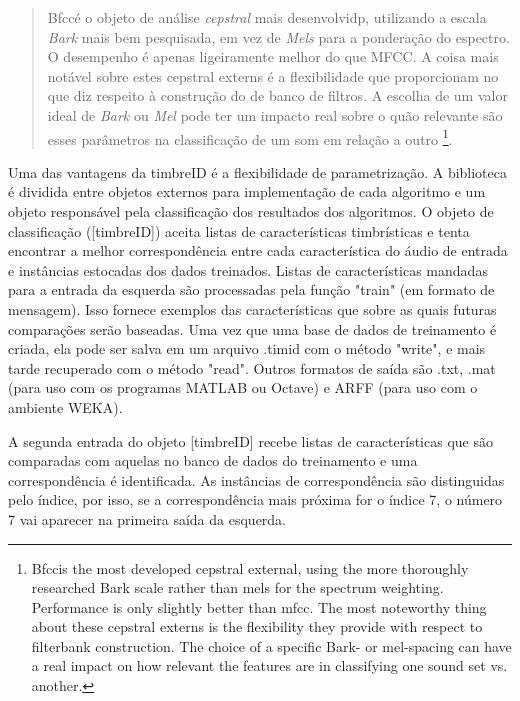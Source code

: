 \documentclass[draft]{ppgmus}
\begin{document}
\begin{quote}
Bfcc\texttildelow é o objeto de análise \textit{cepstral} mais desenvolvidp, utilizando a escala \textit{Bark} 
mais bem pesquisada, em vez de \textit{Mels} para a ponderação do espectro. O desempenho é apenas ligeiramente melhor do 
que MFCC\texttildelow. A coisa mais notável sobre estes cepstral externs é a flexibilidade que proporcionam no 
que diz respeito à construção do de banco de filtros. A escolha de um valor ideal de \textit{Bark} ou \textit{Mel} 
 pode ter um impacto real sobre o quão relevante são esses parâmetros na classificação de um som em relação a outro
\footnote{Bfcc\texttildelow is the most developed cepstral external, using the more thoroughly researched Bark scale rather than mels for 
the spectrum weighting. Performance is only slightly better than mfcc\texttildelow. The most noteworthy thing about these cepstral 
externs is the flexibility they provide with respect to filterbank construction. The choice of a specific Bark- or 
mel-spacing can have a real impact on how relevant the features are in classifying one sound set vs. another.}. 
\cite{brentcepstral}
 
\end{quote}


Uma das vantagens da timbreID é a flexibilidade de parametrização. A biblioteca é dividida
entre objetos externos para implementação de cada algoritmo e um objeto responsável pela
classificação dos resultados dos algoritmos. O objeto de classificação ([timbreID]) aceita
listas de características timbrísticas e tenta encontrar a melhor correspondência entre cada 
característica do áudio de entrada e instâncias estocadas dos dados treinados.
Listas de características mandadas para a entrada da esquerda são processadas pela função
"train" (em formato de mensagem). Isso fornece exemplos das características que sobre as quais
futuras comparações serão baseadas. Uma vez que uma base de dados de treinamento é criada, ela
pode ser salva em um arquivo .timid com o método "write", e mais tarde recuperado com o método
"read". Outros formatos de saída são .txt, .mat (para uso com os programas MATLAB ou Octave)
e ARFF (para uso com o ambiente WEKA).

A segunda entrada do objeto [timbreID] recebe listas de características que são comparadas com
aquelas no banco de dados do treinamento e uma correspondência é identificada. As instâncias de 
correspondência são distinguidas pelo índice, por isso, se a correspondência mais próxima for o 
índice 7, o número 7 vai aparecer na primeira saída da esquerda.
\end{document}
